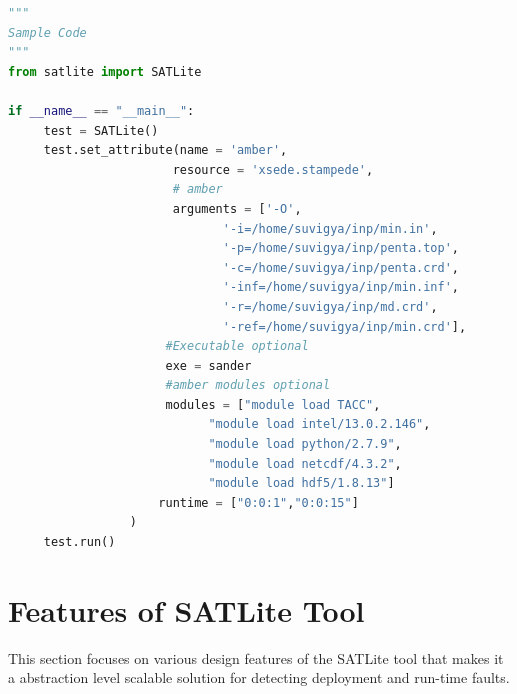 \documentclass[10pt]{ruthesis}
\begin{document}
\begin{lstlisting}[language=Python, linewidth=16cm]
"""
Sample Code
"""
from satlite import SATLite

if __name__ == "__main__":
     test = SATLite()
     test.set_attribute(name = 'amber',
                       resource = 'xsede.stampede',
                       # amber
                       arguments = ['-O',
                              '-i=/home/suvigya/inp/min.in',
                              '-p=/home/suvigya/inp/penta.top',
                              '-c=/home/suvigya/inp/penta.crd',
                              '-inf=/home/suvigya/inp/min.inf',
                              '-r=/home/suvigya/inp/md.crd',
                              '-ref=/home/suvigya/inp/min.crd'],
                      #Executable optional
                      exe = sander
                      #amber modules optional
                      modules = ["module load TACC",
                            "module load intel/13.0.2.146",
                            "module load python/2.7.9",
                            "module load netcdf/4.3.2",
                            "module load hdf5/1.8.13"]
                     runtime = ["0:0:1","0:0:15"]
                 )
     test.run()
\end{lstlisting}

\section{Features of SATLite Tool}
This section focuses on various design features of the SATLite tool that makes it a abstraction level scalable solution for detecting deployment and run-time faults.
\end{document}
